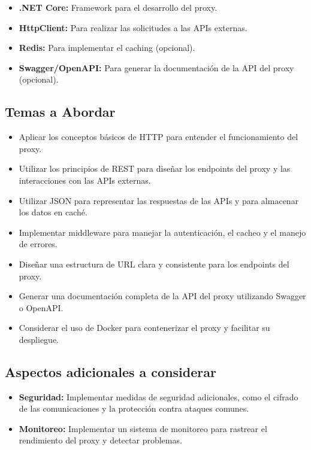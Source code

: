 \documentclass[
]{agujournal2019}
\begin{document}
\begin{itemize}
\item
  \textbf{.NET Core:} Framework para el desarrollo del proxy.
\item
  \textbf{HttpClient:} Para realizar las solicitudes a las APIs
  externas.
\item
  \textbf{Redis:} Para implementar el caching (opcional).
\item
  \textbf{Swagger/OpenAPI:} Para generar la documentación de la API del
  proxy (opcional).
\end{itemize}

\subsection{Temas a Abordar}\label{temas-a-abordar-3}

\begin{itemize}
\item
  Aplicar los conceptos básicos de HTTP para entender el funcionamiento
  del proxy.
\item
  Utilizar los principios de REST para diseñar los endpoints del proxy y
  las interacciones con las APIs externas.
\item
  Utilizar JSON para representar las respuestas de las APIs y para
  almacenar los datos en caché.
\item
  Implementar middleware para manejar la autenticación, el cacheo y el
  manejo de errores.
\item
  Diseñar una estructura de URL clara y consistente para los endpoints
  del proxy.
\item
  Generar una documentación completa de la API del proxy utilizando
  Swagger o OpenAPI.
\item
  Considerar el uso de Docker para contenerizar el proxy y facilitar su
  despliegue.
\end{itemize}

\subsection{Aspectos adicionales a
considerar}\label{aspectos-adicionales-a-considerar-1}

\begin{itemize}
\item
  \textbf{Seguridad:} Implementar medidas de seguridad adicionales, como
  el cifrado de las comunicaciones y la protección contra ataques
  comunes.
\item
  \textbf{Monitoreo:} Implementar un sistema de monitoreo para rastrear
  el rendimiento del proxy y detectar problemas.
\end{itemize}
\end{document}
